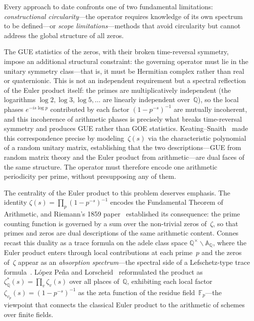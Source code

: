 Every approach to date confronts one of two fundamental limitations:
\emph{constructional circularity}---the operator requires knowledge of
its own spectrum to be defined---or \emph{scope limitations}---methods
that avoid circularity but cannot address the global structure of all
zeros.

The GUE statistics of the zeros, with their broken time-reversal
symmetry, impose an additional structural constraint: the governing
operator must lie in the unitary symmetry class---that is, it must be
Hermitian complex rather than real or quaternionic.  This is not an
independent requirement but a spectral reflection of the Euler product
itself: the primes are multiplicatively independent (the logarithms
$\log 2, \log 3, \log 5,\ldots$ are linearly independent
over~$\mathbb{Q}$), so the local phases $e^{-is\log p}$ contributed
by each factor $(1-p^{-s})^{-1}$ are mutually incoherent, and this
incoherence of arithmetic phases is precisely what breaks time-reversal
symmetry and produces GUE rather than GOE statistics.
Keating--Snaith~\cite{keating00} made this correspondence precise by
modeling~$\zeta(s)$ via the characteristic polynomial of a random
unitary matrix, establishing that the two descriptions---GUE from
random matrix theory and the Euler product from arithmetic---are dual
faces of the same structure.  The operator must therefore encode one
arithmetic periodicity per prime, without presupposing any of them.

The centrality of the Euler product to this problem deserves
emphasis.  The identity
$\zeta(s) = \prod_p (1 - p^{-s})^{-1}$
encodes the Fundamental Theorem of Arithmetic, and Riemann's 1859
paper~\cite{riemann1859} established its consequence: the prime
counting function is governed by a sum over the non-trivial zeros
of~$\zeta$, so that primes and zeros are dual descriptions of the
same arithmetic content.  Connes~\cite{connes99} recast this duality
as a trace formula on the adele class space
$\mathbb{Q}^\times\!\backslash\mathbb{A}_\mathbb{Q}$, where the
Euler product enters through local contributions at each prime~$p$
and the zeros of~$\zeta$ appear as an \emph{absorption spectrum}---the
spectral side of a Lefschetz-type trace formula~\cite{connes16}.
L\'opez Pe\~na and Lorscheid~\cite{lopezpena09torified} reformulated the product as
$\zeta^*_\mathbb{Q}(s) = \prod_{v} \zeta_v(s)$ over all places
of~$\mathbb{Q}$, exhibiting each local factor
$\zeta_{v_p}(s) = (1-p^{-s})^{-1}$ as the zeta function of the
residue field~$\mathbb{F}_p$---the viewpoint that connects the
classical Euler product to the arithmetic of schemes over finite
fields.

